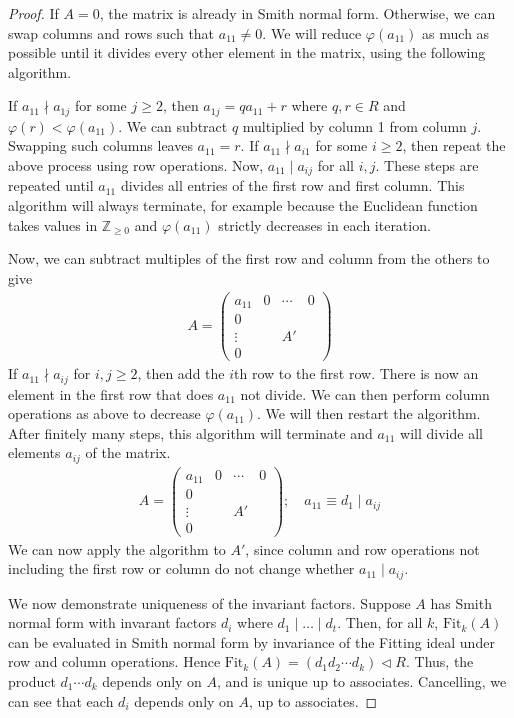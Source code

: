 \begin{proof}
	If $A = 0$, the matrix is already in Smith normal form.
	Otherwise, we can swap columns and rows such that $a_{11} \neq 0$.
	We will reduce $\varphi(a_{11})$ as much as possible until it divides every other element in the matrix, using the following algorithm.

	If $a_{11} \nmid a_{1j}$ for some $j \geq 2$, then $a_{1j} = q a_{11} + r$ where $q, r \in R$ and $\varphi(r) < \varphi(a_{11})$.
	We can subtract $q$ multiplied by column 1 from column $j$.
	Swapping such columns leaves $a_{11} = r$.
	If $a_{11} \nmid a_{i1}$ for some $i \geq 2$, then repeat the above process using row operations.
	Now, $a_{11} \mid a_{ij}$ for all $i,j$.
	These steps are repeated until $a_{11}$ divides all entries of the first row and first column.
	This algorithm will always terminate, for example because the Euclidean function takes values in $\mathbb Z_{\geq 0}$ and $\varphi(a_{11})$ strictly decreases in each iteration.

	Now, we can subtract multiples of the first row and column from the others to give
	\begin{align*}
		A = \begin{pmatrix}
			a_{11} & 0 & \cdots & 0 \\
			0                       \\
			\vdots &   & A'         \\
			0
		\end{pmatrix}
	\end{align*}
	If $a_{11} \nmid a_{ij}$ for $i,j \geq 2$, then add the $i$th row to the first row.
	There is now an element in the first row that does $a_{11}$ not divide.
	We can then perform column operations as above to decrease $\varphi(a_{11})$.
	We will then restart the algorithm.
	After finitely many steps, this algorithm will terminate and $a_{11}$ will divide all elements $a_{ij}$ of the matrix.
	\begin{align*}
		A = \begin{pmatrix}
			a_{11} & 0 & \cdots & 0 \\
			0                       \\
			\vdots &   & A'         \\
			0
		\end{pmatrix};\quad a_{11} \equiv d_1 \mid a_{ij}
	\end{align*}
	We can now apply the algorithm to $A'$, since column and row operations not including the first row or column do not change whether $a_{11} \mid a_{ij}$.

	We now demonstrate uniqueness of the invariant factors.
	Suppose $A$ has Smith normal form with invarant factors $d_i$ where $d_1 \mid \dots \mid d_t$.
	Then, for all $k$, $\mathrm{Fit}_k(A)$ can be evaluated in Smith normal form by invariance of the Fitting ideal under row and column operations.
	Hence $\mathrm{Fit}_k(A) = (d_1 d_2 \cdots d_k) \triangleleft R$.
	Thus, the product $d_1 \cdots d_k$ depends only on $A$, and is unique up to associates.
	Cancelling, we can see that each $d_i$ depends only on $A$, up to associates.
\end{proof}
